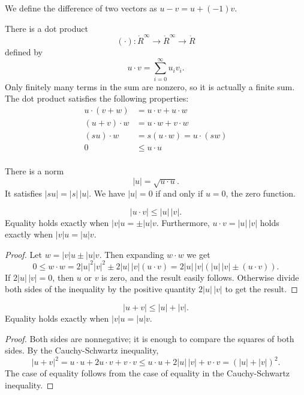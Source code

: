 We define the difference of two vectors as $u - v = u + (-1) v$.


There is a dot product
$$(\cdot):\ring{R}^\infty\to\ring{R}^\infty\to\ring{R}$$ defined by
    $$u\cdot v = \sum_{i=0}^\infty u_i v_i.$$
Only finitely many terms in the sum are nonzero, so it is actually a
finite sum.  The dot product satisfies the following
properties:
    $$\begin{array}{lll}
        u \cdot (v + w) &= u \cdot v + u \cdot w\\
        (u + v)\cdot w &= u \cdot w + v \cdot w\\
        (s u)\cdot w &= s(u \cdot w) = u \cdot (s w)\\
        0 &\le u\cdot u\\
    \end{array}$$


There is a norm
$$|u| = \sqrt{u\cdot u}.$$
It satisfies $| s u | = |s| \, |u|$.  We have $|u|=0$  if and
only if $u=0$, the zero function.

\begin{lemma}
    $$|u \cdot v| \le |u|\,|v|.$$
Equality holds exactly when $|v|u = \pm |u|v$.  Furthermore,
$u\cdot v = |u|\,|v|$ holds exactly when $|v| u = |u| v$.
\end{lemma}

\begin{proof}
   Let $w = |v| u \pm |u| v$.  Then expanding $w\cdot w$ we get
    $$0\le w\cdot w = 2|u|^2|v|^2 \pm 2|u|\, |v| (u\cdot v) =
    2|u|\,
    |v| (|u|\, |v| \pm (u \cdot v)).$$
    If $2|u| \,|v| = 0$, then $u$ or $v$ is zero, and the result
    easily follows.  Otherwise divide both sides of the inequality
    by the positive quantity $2 |u| \,|v|$ to get the result.
\end{proof}

\begin{lemma}
  $$
  |u + v| \le |u| + |v |.
  $$
Equality holds exactly when $|v|u = |u|v$.
\end{lemma}

\begin{proof}
Both sides are nonnegative; it is enough to compare the squares of
both sides.  By the Cauchy-Schwartz inequality,
    $$|u + v|^2 = u\cdot u + 2 u\cdot v + v\cdot v \le
      u\cdot u + 2 | u|\,|v| + v\cdot v = (|u|+|v|)^2.
    $$
The case of equality follows from the case of equality in the
Cauchy-Schwartz inequality.
\end{proof}

